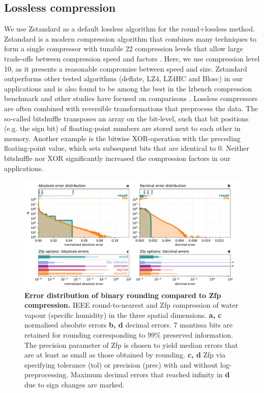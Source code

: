 \subsection{Lossless compression}
\label{sec:compression_lossless}

We use Zstandard as a default lossless algorithm for the round+lossless method. Zstandard is a modern compression algorithm
that combines many techniques to form a single compressor with tunable 22 compression levels that allow large trade-offs between
compression speed and factors \citep{Skibinski2020,Collet2020}. Here, we use compression level 10, as it presents a reasonable
compromise between speed and size. Zstandard outperforms other tested algorithms (deflate, LZ4, LZ4HC and Blosc) in our
applications and is also found to be among the best in the lzbench compression benchmark \citep{Skibinski2020} and other studies
have focused on comparisons \citep{Delaunay2019}. Lossless compressors
are often combined with reversible transformations that preprocess the data. The so-called bitshuffle transposes an array on the
bit-level, such that bit positions (e.g. the sign bit) of floating-point numbers are stored next to each other in memory. Another example
is the bitwise XOR-operation \citep{Pelkonen2015} with the preceding floating-point value, which sets subsequent bits that are identical
to 0. Neither bitshuffle nor XOR significantly increased the compression factors in our applications.

\begin{figure}[tbhp]
	\includegraphics[width=1\textwidth]{Figures/compression/error_distributions.pdf}
	\caption{\textbf{Error distribution of binary rounding compared to Zfp compression.} 
	IEEE round-to-nearest and Zfp compression of water vapour (specific humidity) in the
	three spatial dimensions. \textbf{a, c} normalised absolute errors \textbf{b, d} decimal errors.
	7 mantissa bits are retained for rounding corresponding to 99\% preserved information.
	The precision parameter of Zfp is chosen to yield median errors that are at least as small
	as those obtained by rounding. \textbf{c, d} Zfp via specifying tolerance (tol) or precision (prec)
	with and without log-preprocessing. Maximum decimal errors that reached infinity in \textbf{d}
	due to sign changes are marked.}
	\label{fig:compression_error_distribution}
\end{figure}

